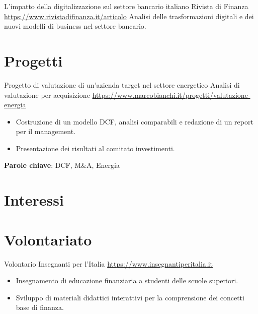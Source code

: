 \documentclass[a4paper, serif, 10pt]{moderncv}
\begin{document}
        {L'impatto della digitalizzazione sul settore bancario italiano}
        {Rivista di Finanza}
        {\url{https://www.rivistadifinanza.it/articolo}}
        {}
        {Analisi delle trasformazioni digitali e dei nuovi modelli di business nel settore bancario.}
\section{Progetti}

        {Progetto di valutazione di un'azienda target nel settore energetico}
        {Analisi di valutazione per acquisizione}
        {\url{https://www.marcobianchi.it/progetti/valutazione-energia}}
        {}
        {\begin{itemize}
\item Costruzione di un modello DCF, analisi comparabili e redazione di un report per il management.
\item Presentazione dei risultati al comitato investimenti.
\end{itemize}
\textbf{Parole chiave}: DCF, M\&A, Energia}
\section{Interessi}

\section{Volontariato}

        {Volontario}
        {Insegnanti per l'Italia}
        {\url{https://www.insegnantiperitalia.it}}
        {}
        {\begin{itemize}
\item Insegnamento di educazione finanziaria a studenti delle scuole superiori.
\item Sviluppo di materiali didattici interattivi per la comprensione dei concetti base di finanza.
\end{itemize}}
    
\end{document}
